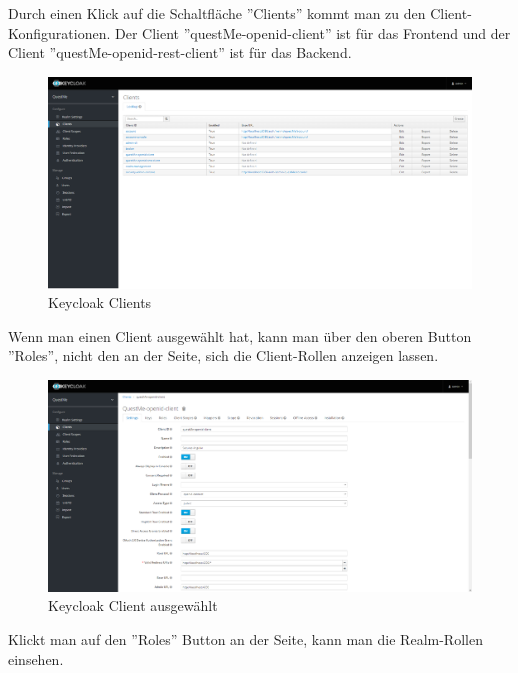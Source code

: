 \noindent Durch einen Klick auf die Schaltfläche ''Clients'' kommt man zu den Client-Konfigurationen. 
Der Client ''questMe-openid-client'' ist für das Frontend und der Client ''questMe-openid-rest-client'' ist für das Backend. 

\begin{figure}[H]
    \centering
    \includegraphics[width=1.0\textwidth]{bilder/administrationshandbuch/keycloak_clients.png}
    \caption{Keycloak Clients}
    \label{fig:Keycloak_Clients}
\end{figure}

\noindent Wenn man einen Client ausgewählt hat, kann man über den oberen Button ''Roles'', nicht den an der Seite, 
sich die Client-Rollen anzeigen lassen.

\begin{figure}[H]
    \centering
    \includegraphics[width=1.0\textwidth]{bilder/administrationshandbuch/keycloak_client_selected.png}
    \caption{Keycloak Client ausgewählt}
    \label{fig:Keycloak_Client_ausgewaehlt}
\end{figure}

\noindent Klickt man auf den ''Roles'' Button an der Seite, kann man die Realm-Rollen einsehen.


